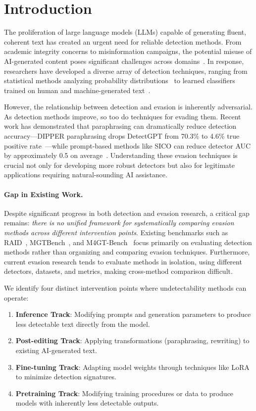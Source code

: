 \section{Introduction}

The proliferation of large language models (LLMs) capable of generating fluent, coherent text has created an urgent need for reliable detection methods. From academic integrity concerns to misinformation campaigns, the potential misuse of AI-generated content poses significant challenges across domains~\citep{solaiman2019release, tang2023science}. In response, researchers have developed a diverse array of detection techniques, ranging from statistical methods analyzing probability distributions~\citep{mitchell2023detectgpt} to learned classifiers trained on human and machine-generated text~\citep{he2024mgtbench}.

However, the relationship between detection and evasion is inherently adversarial. As detection methods improve, so too do techniques for evading them. Recent work has demonstrated that paraphrasing can dramatically reduce detection accuracy---DIPPER paraphrasing drops DetectGPT from 70.3\% to 4.6\% true positive rate~\citep{krishna2023paraphrasing}---while prompt-based methods like SICO can reduce detector AUC by approximately 0.5 on average~\citep{lu2024sico}. Understanding these evasion techniques is crucial not only for developing more robust detectors but also for legitimate applications requiring natural-sounding AI assistance.

\paragraph{Gap in Existing Work.} Despite significant progress in both detection and evasion research, a critical gap remains: \textit{there is no unified framework for systematically comparing evasion methods across different intervention points}. Existing benchmarks such as RAID~\citep{dugan2024raid}, MGTBench~\citep{he2024mgtbench}, and M4GT-Bench~\citep{wang2024m4gt} focus primarily on evaluating detection methods rather than organizing and comparing evasion techniques. Furthermore, current evasion research tends to evaluate methods in isolation, using different detectors, datasets, and metrics, making cross-method comparison difficult.

We identify four distinct intervention points where undetectability methods can operate:
\begin{enumerate}
    \item \textbf{Inference Track}: Modifying prompts and generation parameters to produce less detectable text directly from the model.
    \item \textbf{Post-editing Track}: Applying transformations (paraphrasing, rewriting) to existing AI-generated text.
    \item \textbf{Fine-tuning Track}: Adapting model weights through techniques like LoRA to minimize detection signatures.
    \item \textbf{Pretraining Track}: Modifying training procedures or data to produce models with inherently less detectable outputs.
\end{enumerate}

